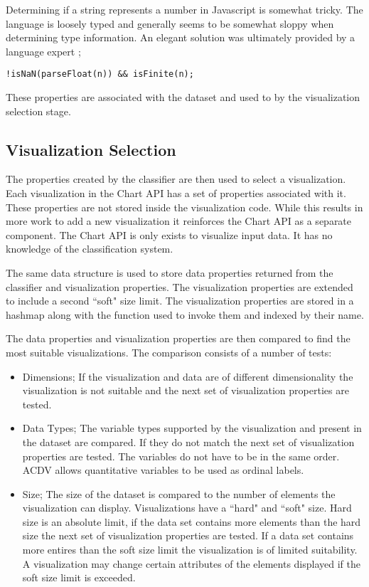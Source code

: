 \documentclass[a4paper, 11pt, titlepage, onehalfspacing]{report}
\begin{document}
Determining if a string represents a number in Javascript is somewhat tricky. The language is loosely typed and generally seems to be somewhat sloppy when determining type information. An elegant solution was ultimately provided by a language expert \cite{isnumber}; 
\begin{verbatim}
!isNaN(parseFloat(n)) && isFinite(n);
\end{verbatim}

These properties are associated with the dataset and used to by the visualization selection stage.

\subsection{Visualization Selection}
The properties created by the classifier are then used to select a visualization. Each visualization in the Chart API has a set of properties associated with it. These properties are not stored inside the visualization code. While this results in more work to add a new visualization it reinforces the Chart API as a separate component. The Chart API is only exists to visualize input data. It has no knowledge of the classification system.

The same data structure is used to store data properties returned from the classifier and visualization properties. The visualization properties are extended to include a second ``soft" size limit. The visualization properties are stored in a hashmap along with the function used to invoke them and indexed by their name. 

The data properties and visualization properties are then compared to find the most suitable visualizations. The comparison consists of a number of tests:
\begin{itemize}
\item Dimensions; If the visualization and data are of different dimensionality the visualization is not suitable and the next set of visualization properties are tested.
\item Data Types; The variable types supported by the visualization and present in the dataset are compared. If they do not match the next set of visualization properties are tested. The variables do not have to be in the same order. AC\lightning{}DV allows quantitative variables to be used as ordinal labels.
\item Size; The size of the dataset is compared to the number of elements the visualization can display. Visualizations have a ``hard" and ``soft" size. Hard size is an absolute limit, if the data set contains more elements than the hard size the next set of visualization properties are tested. If a data set contains more entires than the soft size limit the visualization is of limited suitability. A visualization may change certain attributes of the elements displayed if the soft size limit is exceeded.
\end{itemize}
\end{document}
